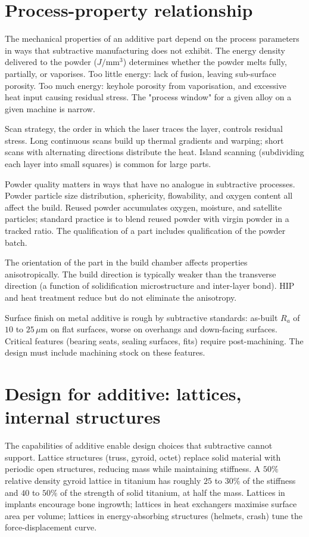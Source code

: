 \section{Process-property relationship}

The mechanical properties of an additive part depend on the process parameters in ways that subtractive manufacturing does not exhibit. The energy density delivered to the powder ($J/\text{mm}^3$) determines whether the powder melts fully, partially, or vaporises. Too little energy: lack of fusion, leaving sub-surface porosity. Too much energy: keyhole porosity from vaporisation, and excessive heat input causing residual stress. The "process window" for a given alloy on a given machine is narrow.

Scan strategy, the order in which the laser traces the layer, controls residual stress. Long continuous scans build up thermal gradients and warping; short scans with alternating directions distribute the heat. Island scanning (subdividing each layer into small squares) is common for large parts.

Powder quality matters in ways that have no analogue in subtractive processes. Powder particle size distribution, sphericity, flowability, and oxygen content all affect the build. Reused powder accumulates oxygen, moisture, and satellite particles; standard practice is to blend reused powder with virgin powder in a tracked ratio. The qualification of a part includes qualification of the powder batch.

The orientation of the part in the build chamber affects properties anisotropically. The build direction is typically weaker than the transverse direction (a function of solidification microstructure and inter-layer bond). HIP and heat treatment reduce but do not eliminate the anisotropy.

Surface finish on metal additive is rough by subtractive standards: as-built $R_a$ of $10$ to $25\,\mu\text{m}$ on flat surfaces, worse on overhangs and down-facing surfaces. Critical features (bearing seats, sealing surfaces, fits) require post-machining. The design must include machining stock on these features.

\section{Design for additive: lattices, internal structures}

The capabilities of additive enable design choices that subtractive cannot support. Lattice structures (truss, gyroid, octet) replace solid material with periodic open structures, reducing mass while maintaining stiffness. A $50\%$ relative density gyroid lattice in titanium has roughly $25$ to $30\%$ of the stiffness and $40$ to $50\%$ of the strength of solid titanium, at half the mass. Lattices in implants encourage bone ingrowth; lattices in heat exchangers maximise surface area per volume; lattices in energy-absorbing structures (helmets, crash) tune the force-displacement curve.

